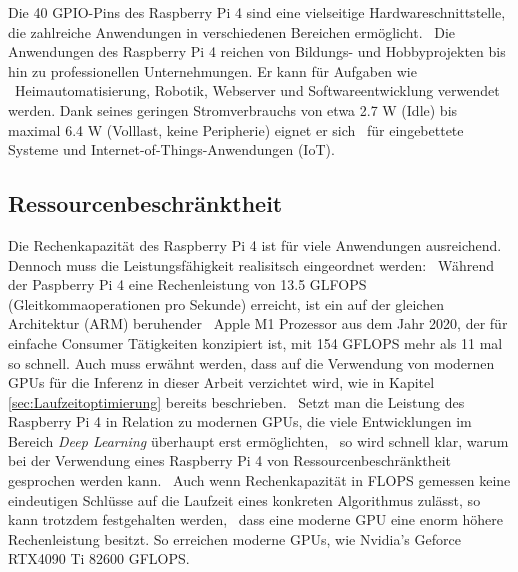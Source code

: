 Die 40 GPIO-Pins des Raspberry Pi 4 sind eine vielseitige Hardwareschnittstelle, die zahlreiche Anwendungen in verschiedenen Bereichen ermöglicht. \
Die Anwendungen des Raspberry Pi 4 reichen von Bildungs- und Hobbyprojekten bis hin zu professionellen Unternehmungen. Er kann für Aufgaben wie \ 
Heimautomatisierung, Robotik, Webserver und Softwareentwicklung verwendet werden. 
Dank seines geringen Stromverbrauchs von etwa \num{2,7} W (Idle) bis maximal \num{6,4} W (Volllast, keine Peripherie)\cite{powerconsumptionpi} eignet er sich \ 
für eingebettete Systeme und Internet-of-Things-Anwendungen (IoT).\cite{specspi}\cite{wikipi}
\subsection{Ressourcenbeschränktheit}\label{subsec:RaspberryPi4BRessourcenbeschraenktheit}
Die Rechenkapazität des Raspberry Pi 4 ist für viele Anwendungen ausreichend. Dennoch muss die Leistungsfähigkeit realisitsch eingeordnet werden: \
Während der Paspberry Pi 4 eine Rechenleistung von \num{13,5} GLFOPS (Gleitkommaoperationen pro Sekunde) erreicht, ist ein auf der gleichen Architektur (ARM) beruhender \
Apple M1 Prozessor aus dem Jahr 2020, der für einfache Consumer Tätigkeiten konzipiert ist, mit \num{154} GFLOPS mehr als 11 mal so schnell. \cite{flopscpu}
Auch muss erwähnt werden, dass auf die Verwendung von modernen GPUs für die Inferenz in dieser Arbeit verzichtet wird, wie in Kapitel \ref{sec:Laufzeitoptimierung} bereits beschrieben. \
Setzt man die Leistung des Raspberry Pi 4 in Relation zu modernen GPUs, die viele Entwicklungen im Bereich \textit{Deep Learning} überhaupt erst ermöglichten, \
so wird schnell klar, warum bei der Verwendung eines Raspberry Pi 4 von \glqq Ressourcenbeschränktheit\grqq{} gesprochen werden kann. \
Auch wenn Rechenkapazität in FLOPS gemessen keine eindeutigen Schlüsse auf die Laufzeit eines konkreten Algorithmus zulässt, so kann trotzdem festgehalten werden, \
dass eine moderne GPU eine enorm höhere Rechenleistung besitzt. So erreichen moderne GPUs, wie Nvidia's Geforce RTX4090 Ti \num{82600} GFLOPS.\cite{flopsrtx4090}\\

